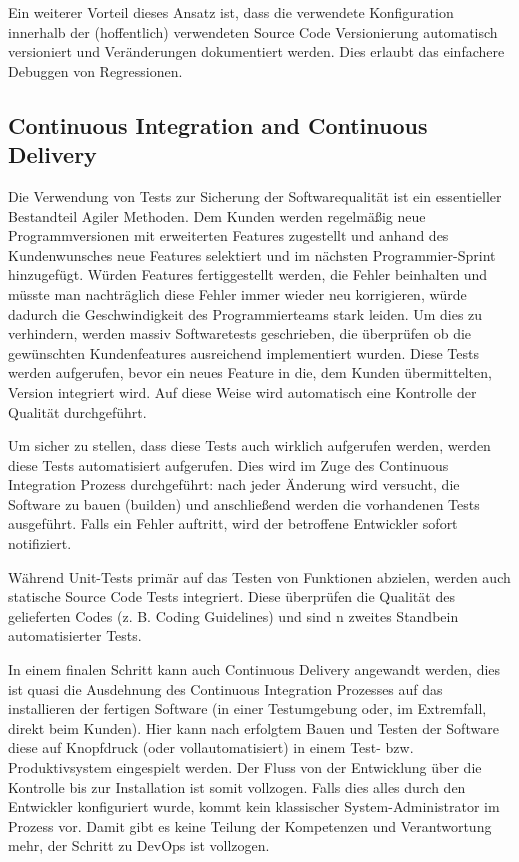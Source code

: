 Ein weiterer Vorteil dieses Ansatz ist, dass die verwendete Konfiguration innerhalb der (hoffentlich) verwendeten Source Code Versionierung automatisch versioniert und Veränderungen dokumentiert werden. Dies erlaubt das einfachere Debuggen von Regressionen.

\subsection{Continuous Integration and Continuous Delivery}

Die Verwendung von Tests zur Sicherung der Softwarequalität ist ein essentieller Bestandteil Agiler Methoden. Dem Kunden werden regelmäßig neue Programmversionen mit erweiterten Features zugestellt und anhand des Kundenwunsches neue Features selektiert und im nächsten Programmier-Sprint hinzugefügt. Würden Features fertiggestellt werden, die Fehler beinhalten und müsste man nachträglich diese Fehler immer wieder neu korrigieren, würde dadurch die Geschwindigkeit des Programmierteams stark leiden. Um dies zu verhindern, werden massiv Softwaretests geschrieben, die überprüfen ob die gewünschten Kundenfeatures ausreichend implementiert wurden. Diese Tests werden aufgerufen, bevor ein neues Feature in die, dem Kunden übermittelten, Version integriert wird. Auf diese Weise wird automatisch eine Kontrolle der Qualität durchgeführt.

Um sicher zu stellen, dass diese Tests auch wirklich aufgerufen werden, werden diese Tests automatisiert aufgerufen. Dies wird im Zuge des Continuous Integration Prozess durchgeführt: nach jeder Änderung wird versucht, die Software zu bauen (builden) und anschließend werden die vorhandenen Tests ausgeführt. Falls ein Fehler auftritt, wird der betroffene Entwickler sofort notifiziert.

Während Unit-Tests primär auf das Testen von Funktionen abzielen, werden auch statische Source Code Tests integriert. Diese überprüfen die Qualität des gelieferten Codes (z. B. Coding Guidelines) und sind n zweites Standbein automatisierter Tests.

In einem finalen Schritt kann auch Continuous Delivery angewandt werden, dies ist quasi die Ausdehnung des Continuous Integration Prozesses auf das installieren der fertigen Software (in einer Testumgebung oder, im Extremfall, direkt beim Kunden). Hier kann nach erfolgtem Bauen und Testen der Software diese auf Knopfdruck (oder vollautomatisiert) in einem Test- bzw. Produktivsystem eingespielt werden. Der Fluss von der Entwicklung über die Kontrolle bis zur Installation ist somit vollzogen. Falls dies alles durch den Entwickler konfiguriert wurde, kommt kein klassischer System-Administrator im Prozess vor. Damit gibt es keine Teilung der Kompetenzen und Verantwortung mehr, der Schritt zu DevOps ist vollzogen. 

